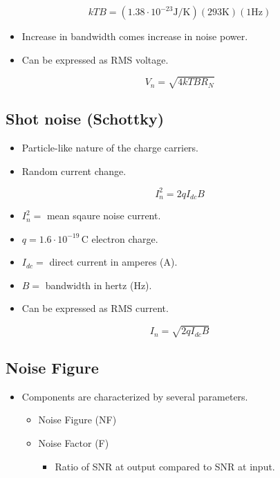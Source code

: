 \begin{equation}
kTB = (1.38\cdot 10^{-23}\si{\joule/\kelvin})(293\si{\kelvin})(1\si{\hertz})
\end{equation}

\begin{itemize}
	\item Increase in bandwidth comes increase in noise power.
	\item Can be expressed as RMS voltage.
\end{itemize}

\begin{equation}
V_n = \sqrt{4kTBR_N}
\end{equation}

\subsection{Shot noise (Schottky)}
\begin{itemize}
	\item Particle-like nature of the charge carriers.
	\item Random current change.
\end{itemize}

\begin{equation}
I_n^2=2qI_{dc}B
\end{equation}

\begin{itemize}
	\item $I_n^2 =$ mean sqaure noise current.
	\item $q =1.6\cdot 10^{-19} \,\si{\coulomb}$ electron charge.
	\item $I_{dc} =$ direct current in amperes (\si{\ampere}).
	\item $B = $ bandwidth in hertz (\si{\hertz}).
\end{itemize}

\begin{itemize}
	\item Can be expressed as RMS current.
\end{itemize}

\begin{equation}
I_n=\sqrt{2qI_{dc}B}
\end{equation}

\subsection{Noise Figure}
\begin{itemize}
	\item Components are characterized by several parameters.
	\begin{itemize}
		\item Noise Figure (NF)
		\item Noise Factor (F)
		\begin{itemize}
			\item Ratio of SNR at output compared to SNR at input.
		\end{itemize}
	\end{itemize}
\end{itemize} 

